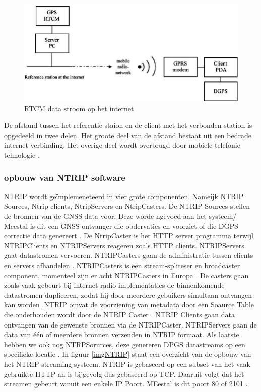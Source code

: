 \begin{figure}[hpb]
	\includegraphics[scale=0.4]{NTRIP2.png}
	\caption{RTCM data stroom op het internet \cite{LBibNTRIP2}}
	\label{imgNTRIP2}
\end{figure} 
De afstand tussen het referentie staion en de client met het verbonden station is opgedeeld in twee delen. Het groote deel van de afstand bestaat uit een bedrade internet verbinding. Het overige deel wordt overbrugd door mobiele telefonie tehnologie \cite{LBibNTRIP2}.

\subsubsection{opbouw van NTRIP software}
\label{LONS}
NTRIP wordt ge\"implemeneteerd in vier grote componenten. Nameijk NTRIP Sources, Ntrip clients, NtripServers en NtripCasters. De NTRIP Sources stellen de bronnen van de GNSS data voor. Deze worde ngevoed aan het systeem/ Meestal is dit een GNSS ontvanger die obdervaties en voorziet of die DGPS correctie data genereert \cite{LBibNTRIP3}. De NtripCaster is het HTTP server programma terwijl NTRIPClients en NTRIPServers reageren zoals HTTP clients\cite{LBibNTRIP}. NTRIPServers gaat datastromen vervoeren. NTRIPCasters gaan de administratie tussen clients en servers afhandelen \cite{LBibGPS}. NTRIPCasters is een stream-spliteser en broadcaster component, momenteel zijn er acht NTRIPCasters in Europa \cite{LBibNTRIP}. De casters gaan zoals vaak gebeurt bij internet radio implementaties de binnenkomende datastromen dupliceren, zodat hij door meerdere gebuikers simultaan ontvangen kan worden \cite{LBibNTRIP2}.NTRIP omvat de voorziening van metadata door een Soaurce Table die onderhouden wordt door de NTRIP Caster \cite{LBibNTRIP3}.  NTRIP Clients gaan data ontvangen van de gewenste bronnen via de NTRIPCaster. NTRIPServers gaan de data van \'e\'en of meerdere bronnen verzenden in NTRIP formaat. Als laatste hebben we ook nog NTRPSorurces, deze genereren DPGS datastreams op een specifieke locatie \cite{LBibNTRIP}. In figuur \ref{imgNTRIP} staat een overzicht van de opbouw van het NTRIP streaming systeem. NTRIP is gebaseerd op een subset van het  vaak gebruikte HTTP an is bijgevolg dus gebaseerd op TCP. Daaruit volgt dat het streamen gebeurt vanuit een enkele IP Poort. MEestal is dit poort 80 of 2101 \cite{LBibNTRIP3}. 

